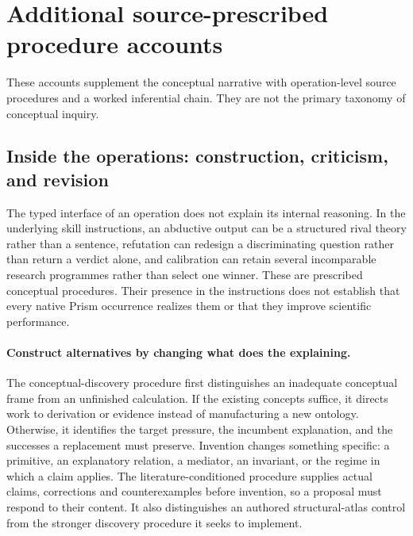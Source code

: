 %
%
%
\clearpage
\section{Additional source-prescribed procedure accounts}
\label{app:procedure-supplement}
These accounts supplement the conceptual narrative with operation-level source
procedures and a worked inferential chain. They are not the primary taxonomy
of conceptual inquiry.
\subsection{Inside the operations: construction, criticism, and revision}
\label{sec:mechanism-depth}
The typed interface of an operation does not explain its internal reasoning. In the underlying skill instructions, an abductive output can be a structured rival theory rather than a sentence, refutation can redesign a discriminating question rather than return a verdict alone, and calibration can retain several incomparable research programmes rather than select one winner. These are prescribed conceptual procedures. Their presence in the instructions does not establish that every native Prism occurrence realizes them or that they improve scientific performance.

\paragraph{Construct alternatives by changing what does the explaining.}
The conceptual-discovery procedure first distinguishes an inadequate conceptual frame from an unfinished calculation. If the existing concepts suffice, it directs work to derivation or evidence instead of manufacturing a new ontology. Otherwise, it identifies the target pressure, the incumbent explanation, and the successes a replacement must preserve. Invention changes something specific: a primitive, an explanatory relation, a mediator, an invariant, or the regime in which a claim applies. The literature-conditioned procedure supplies actual claims, corrections and counterexamples before invention, so a proposal must respond to their content. It also distinguishes an authored structural-atlas control from the stronger discovery procedure it seeks to implement.

